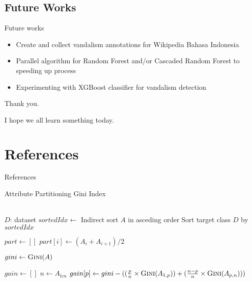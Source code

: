 \documentclass[english]{beamer}
\begin{document}
\subsection{Future Works}
\begin{frame}
	{Future works}
	\begin{itemize}
		\item Create and collect vandalism annotations for Wikipedia Bahasa
		Indonesia
		\item Parallel algorithm for Random Forest and/or Cascaded Random
		Forest to speeding up process
		\item Experimenting with XGBoost classifier for vandalism detection
	\end{itemize}
\end{frame}

\begin{frame}{}{}
	Thank you.

	I hope we all learn something today.
\end{frame}

\section*{References}

\begin{frame}{References}
\printbibliography
\end{frame}

\begin{frame}
	{Attribute Partitioning}
	{Gini Index}
	\small
	\begin{algorithmic}[1]
		\Require \\
		$ D $: dataset
				\State $ sortedIdx \gets $ Indirect sort $A$ in asceding
				order
				\State Sort target class $D$ by $ sortedIdx $

				\State $ part \gets [ ] $
					\State $ part[i] \gets (A_{i} + A_{i+1}) / 2 $
				\EndFor

				\State $ gini \gets \Call{Gini}{A} $

				\State $ gain \gets [ ] $
				\State $ n \gets A_{len} $
					\State $ gain[p] \gets gini - (
						(\frac{p}{n} \times \Call{Gini}{A_{1,p}})
						+
						(\frac{n - p}{n} \times \Call{Gini}{A_{p,n}})
						)
						$
				\EndFor
			\EndFor
		\EndFunction
	\end{algorithmic}
\end{frame}
\end{document}
